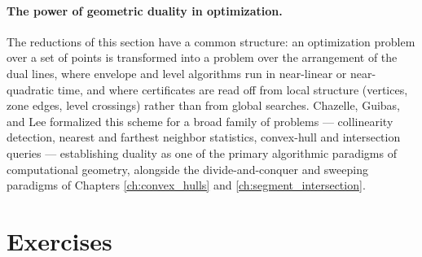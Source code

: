 \paragraph{The power of geometric duality in optimization.}
The reductions of this section have a common structure: an optimization
problem over a set of points is transformed into a problem over the 
arrangement of the dual lines, where envelope and level algorithms run in
near-linear or near-quadratic time, and where certificates are read off
from local structure (vertices, zone edges, level crossings) rather than
from global searches. Chazelle, Guibas, and Lee \cite{chazelle1985power}
formalized this scheme for a broad family of problems --- collinearity
detection, nearest and farthest neighbor statistics, convex-hull and
intersection queries --- establishing duality as one of the primary
algorithmic paradigms of computational geometry, alongside the
divide-and-conquer and sweeping paradigms of Chapters
\ref{ch:convex_hulls} and \ref{ch:segment_intersection}.

\section{Exercises}
\label{sec:duality_exercises}

